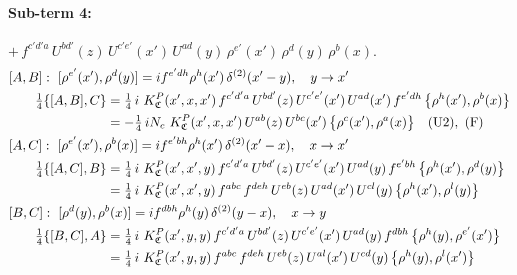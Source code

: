 \documentclass[10pt]{article}
\numberwithin{equation}{section}
\begin{document}
\paragraph{Sub-term 4:} $+\,f^{c'd'a}\,U^{bd'}(z)\,U^{c'e'}(x')\,U^{ad}(y)\,\rho^{e'}(x')\,\rho^{d}(y)\,\rho^{b}(x)$.
\begin{align}
&[A,B]:\ [\rho^{e'}(x'),\rho^{d}(y)]=i f^{e'dh}\rho^{h}(x')\,\delta^{(2)}(x'-y),\quad y\to x'\notag\\
&\qquad \tfrac14\{[A,B],C\}=\tfrac14\,i\,\,K^{P}_{\mathfrak C}(x',x,x')\,f^{c'd'a}\,U^{bd'}(z)\,U^{c'e'}(x')\,U^{ad}(x')\,f^{e'dh}\,\big\{\rho^{h}(x'),\rho^{b}(x)\big\}\notag\\
&\qquad\phantom{\tfrac14\{[A,B],C\}}=-\tfrac14\,i N_{c}\,\,K^{P}_{\mathfrak C}(x',x,x')\,U^{ab}(z)\,U^{bc}(x')\,\big\{\rho^{c}(x'),\rho^{a}(x)\big\}\quad\text{(U2)},\ \text{(F)}
\label{eq:GIII.VI.P-4-AB}\\
&[A,C]:\ [\rho^{e'}(x'),\rho^{b}(x)]=i f^{e'bh}\rho^{h}(x')\,\delta^{(2)}(x'-x),\quad x\to x'\notag\\
&\qquad \tfrac14\{[A,C],B\}=\tfrac14\,i\,\,K^{P}_{\mathfrak C}(x',x',y)\,f^{c'd'a}\,U^{bd'}(z)\,U^{c'e'}(x')\,U^{ad}(y)\,f^{e'bh}\,\big\{\rho^{h}(x'),\rho^{d}(y)\big\}\notag\\
&\qquad\phantom{\tfrac14\{[A,C],B\}}=\tfrac14\,i\,\,K^{P}_{\mathfrak C}(x',x',y)\,f^{abc}\,f^{deh}\,U^{eb}(z)\,U^{ad}(x')\,U^{cl}(y)\,\big\{\rho^{h}(x'),\rho^{l}(y)\big\}
\label{eq:GIII.VI.P-4-AC}\\
&[B,C]:\ [\rho^{d}(y),\rho^{b}(x)]=i f^{dbh}\rho^{h}(y)\,\delta^{(2)}(y-x),\quad x\to y\notag\\
&\qquad \tfrac14\{[B,C],A\}=\tfrac14\,i\,\,K^{P}_{\mathfrak C}(x',y,y)\,f^{c'd'a}\,U^{bd'}(z)\,U^{c'e'}(x')\,U^{ad}(y)\,f^{dbh}\,\big\{\rho^{h}(y),\rho^{e'}(x')\big\}\notag\\
&\qquad\phantom{\tfrac14\{[B,C],A\}}=\tfrac14\,i\,\,K^{P}_{\mathfrak C}(x',y,y)\,f^{abc}\,f^{deh}\,U^{eb}(z)\,U^{al}(x')\,U^{cd}(y)\,\big\{\rho^{h}(y),\rho^{l}(x')\big\}
\label{eq:GIII.VI.P-4-BC}
\end{align}
\end{document}
